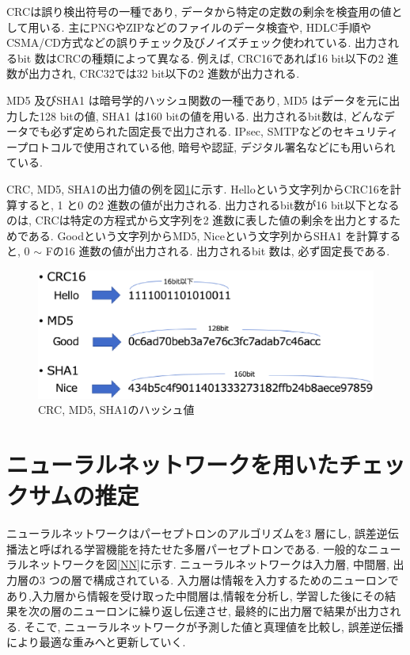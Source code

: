 \documentclass[11pt]{jbook}
\begin{document}
CRC\cite{crc}は誤り検出符号の一種であり, データから特定の定数の剰余を検査用の値として用いる.
主にPNGやZIPなどのファイルのデータ検査や, HDLC手順やCSMA/CD方式などの誤りチェック及びノイズチェック使われている.
出力されるbit 数はCRC\cite{crc}の種類によって異なる.
例えば, CRC16\cite{crc}であれば16 bit以下の2 進数が出力され, CRC32\cite{crc}では32 bit以下の2 進数が出力される.

MD5\cite{md5} 及びSHA1\cite{sha1} は暗号学的ハッシュ関数の一種であり, MD5\cite{md5} はデータを元に出力した128 bitの値, SHA1\cite{sha1} は160 bitの値を用いる.
出力されるbit数は, どんなデータでも必ず定められた固定長で出力される.
IPsec, SMTPなどのセキュリティープロトコルで使用されている他, 暗号や認証, デジタル署名などにも用いられている.

CRC\cite{crc}, MD5\cite{md5}, SHA1\cite{sha1}の出力値の例を図\ref{hash}に示す.
Helloという文字列からCRC16\cite{crc}を計算すると, 1 と0 の2 進数の値が出力される.
出力されるbit数が16 bit以下となるのは, CRCは特定の方程式から文字列を2 進数に表した値の剰余を出力とするためである.
Goodという文字列からMD5\cite{md5}, Niceという文字列からSHA1\cite{sha1} を計算すると, 0 $\sim$ Fの16 進数の値が出力される.
出力されるbit 数は, 必ず固定長である.

\begin{figure}[htbp]
\begin{center}
\includegraphics[width=130mm]{hash.eps}
\caption{CRC, MD5, SHA1のハッシュ値}
\label{hash}
\end{center}
\end{figure}


\section{ニューラルネットワークを用いたチェックサムの推定}

ニューラルネットワークはパーセプトロンのアルゴリズムを3 層にし, 誤差逆伝播法と呼ばれる学習機能を持たせた多層パーセプトロンである.
一般的なニューラルネットワークを図\ref{NN}に示す.
ニューラルネットワークは入力層, 中間層, 出力層の3 つの層で構成されている.
入力層は情報を入力するためのニューロンであり,入力層から情報を受け取った中間層は,情報を分析し, 学習した後にその結果を次の層のニューロンに繰り返し伝達させ,
最終的に出力層で結果が出力される.
そこで, ニューラルネットワークが予測した値と真理値を比較し, 誤差逆伝播により最適な重みへと更新していく.
\end{document}
